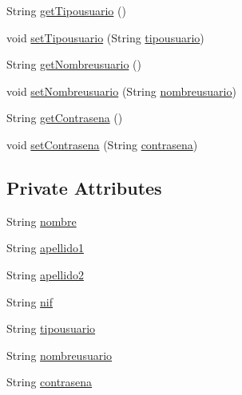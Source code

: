 \begin{DoxyCompactItemize}
\item 
String \mbox{\hyperlink{classlibreria_1_1_cliente_a3111aacdea652c8dd96664c643c3c52a}{get\+Tipousuario}} ()
\item 
void \mbox{\hyperlink{classlibreria_1_1_cliente_a4f67320d89bdf56838f95fa9cf493e45}{set\+Tipousuario}} (String \mbox{\hyperlink{classlibreria_1_1_cliente_a7b289ea086987adbd145bf6dc8024e9e}{tipousuario}})
\item 
String \mbox{\hyperlink{classlibreria_1_1_cliente_a8456709fe1bc5fe72550413bb38b2ce3}{get\+Nombreusuario}} ()
\item 
void \mbox{\hyperlink{classlibreria_1_1_cliente_aace12b3fcc4e17f5aa871230ed25878d}{set\+Nombreusuario}} (String \mbox{\hyperlink{classlibreria_1_1_cliente_a3018645e586ef4b1abef3ac1a7f2a464}{nombreusuario}})
\item 
String \mbox{\hyperlink{classlibreria_1_1_cliente_afd6dd9ddfe54f2c7a1091268901bc0ab}{get\+Contrasena}} ()
\item 
void \mbox{\hyperlink{classlibreria_1_1_cliente_a7b98051bfe7df2214d6e191a72cd3e11}{set\+Contrasena}} (String \mbox{\hyperlink{classlibreria_1_1_cliente_a0d80894cab7e9d1e3b531d29cf160737}{contrasena}})
\end{DoxyCompactItemize}
\subsection*{Private Attributes}
\begin{DoxyCompactItemize}
\item 
String \mbox{\hyperlink{classlibreria_1_1_cliente_ab7862ac1d181becc7cf8a88ecf07b570}{nombre}}
\item 
String \mbox{\hyperlink{classlibreria_1_1_cliente_a9f1a869f9f8b0e14df73be50e636532e}{apellido1}}
\item 
String \mbox{\hyperlink{classlibreria_1_1_cliente_a9b97686667a729a4c0fd8b19d72b389a}{apellido2}}
\item 
String \mbox{\hyperlink{classlibreria_1_1_cliente_a6d50af0b6448c8ac66e9ae08c436cdfe}{nif}}
\item 
String \mbox{\hyperlink{classlibreria_1_1_cliente_a7b289ea086987adbd145bf6dc8024e9e}{tipousuario}}
\item 
String \mbox{\hyperlink{classlibreria_1_1_cliente_a3018645e586ef4b1abef3ac1a7f2a464}{nombreusuario}}
\item 
String \mbox{\hyperlink{classlibreria_1_1_cliente_a0d80894cab7e9d1e3b531d29cf160737}{contrasena}}
\end{DoxyCompactItemize}


